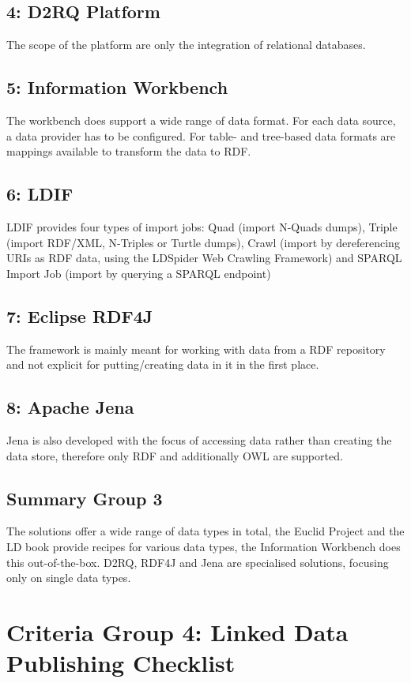 \subsection*{4: D2RQ Platform}
The scope of the platform are only the integration of relational databases.

\subsection*{5: Information Workbench}
The workbench does support a wide range of data format. For each data source, a data provider has to be configured. For table- and tree-based data formats are mappings available to transform the data to RDF.

\subsection*{6: LDIF}
LDIF provides four types of import jobs: Quad (import N-Quads dumps), Triple (import RDF/XML, N-Triples or Turtle dumps), Crawl (import by dereferencing URIs as RDF data, using the LDSpider Web Crawling Framework) and SPARQL Import Job (import by querying a SPARQL endpoint)

\subsection*{7: Eclipse RDF4J}
The framework is mainly meant for working with data from a RDF repository and not explicit for putting/creating data in it in the first place. 

\subsection*{8: Apache Jena}
Jena is also developed with the focus of accessing data rather than creating the data store, therefore only RDF and additionally OWL are supported.

\subsection{Summary Group 3}
The solutions offer a wide range of data types in total, the Euclid Project and the LD book provide recipes for various data types, the Information Workbench does this out-of-the-box. D2RQ, RDF4J and Jena are specialised solutions, focusing only on single data types.

\section{Criteria Group 4: Linked Data Publishing Checklist}

